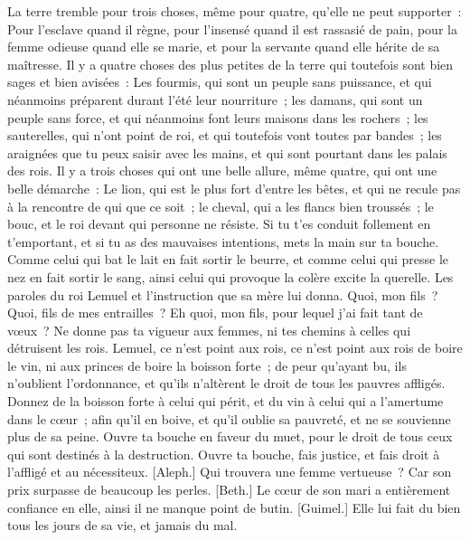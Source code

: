 \begin{multicols}{2}
La terre tremble pour trois choses, même pour quatre, qu'elle ne peut supporter~:
Pour l'esclave quand il règne, pour l'insensé quand il est rassasié de pain,
pour la femme odieuse quand elle se marie, et pour la servante quand elle hérite de sa maîtresse.
Il y a quatre choses des plus petites de la terre qui toutefois sont bien sages et bien avisées~:
Les fourmis, qui sont un peuple sans puissance, et qui néanmoins préparent durant l'été leur nourriture~;
les damans, qui sont un peuple sans force, et qui néanmoins font leurs maisons dans les rochers~;
les sauterelles, qui n'ont point de roi, et qui toutefois vont toutes par bandes~;
les araignées que tu peux saisir avec les mains, et qui sont pourtant dans les palais des rois.
Il y a trois choses qui ont une belle allure, même quatre, qui ont une belle démarche~:
Le lion, qui est le plus fort d'entre les bêtes, et qui ne recule pas à la rencontre de qui que ce soit~;
le cheval, qui a les flancs bien troussés~; le bouc, et le roi devant qui personne ne résiste.
Si tu t'es conduit follement en t'emportant, et si tu as des mauvaises intentions, mets la main sur ta bouche.
Comme celui qui bat le lait en fait sortir le beurre, et comme celui qui presse le nez en fait sortir le sang, ainsi celui qui provoque la colère excite la querelle.
\VerseOne{}Les paroles du roi Lemuel et l'instruction que sa mère lui donna.
Quoi, mon fils~? Quoi, fils de mes entrailles~? Eh quoi, mon fils, pour lequel j'ai fait tant de vœux~?
Ne donne pas ta vigueur aux femmes, ni tes chemins à celles qui détruisent les rois.
Lemuel, ce n'est point aux rois, ce n'est point aux rois de boire le vin, ni aux princes de boire la boisson forte~;
de peur qu'ayant bu, ils n'oublient l'ordonnance, et qu'ils n'altèrent le droit de tous les pauvres affligés.
Donnez de la boisson forte à celui qui périt, et du vin à celui qui a l'amertume dans le cœur~;
afin qu'il en boive, et qu'il oublie sa pauvreté, et ne se souvienne plus de sa peine.
Ouvre ta bouche en faveur du muet, pour le droit de tous ceux qui sont destinés à la destruction.
Ouvre ta bouche, fais justice, et fais droit à l'affligé et au nécessiteux. 
[Aleph.] Qui trouvera une femme vertueuse~? Car son prix surpasse de beaucoup les perles.
[Beth.] Le cœur de son mari a entièrement confiance en elle, ainsi il ne manque point de butin.
[Guimel.] Elle lui fait du bien tous les jours de sa vie, et jamais du mal.

\end{multicols}

